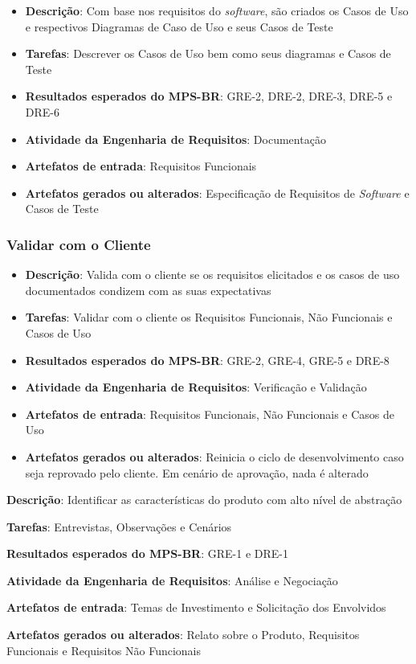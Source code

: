 \begin{itemize}
\item \textbf{Descrição}: Com base nos requisitos do \textit{software}, são criados os Casos de Uso e respectivos Diagramas de Caso de Uso e seus Casos de Teste
\item \textbf{Tarefas}: Descrever os Casos de Uso bem como seus diagramas e Casos de Teste
\item \textbf{Resultados esperados do MPS-BR}: GRE-2, DRE-2, DRE-3, DRE-5 e DRE-6
\item \textbf{Atividade da Engenharia de Requisitos}: Documentação
\item \textbf{Artefatos de entrada}: Requisitos Funcionais
\item \textbf{Artefatos gerados ou alterados}: Especificação de Requisitos de \textit{Software} e Casos de Teste
\end{itemize}

\subsubsection{Validar com o Cliente}

\begin{itemize}
\item \textbf{Descrição}: Valida com o cliente se os requisitos elicitados e os casos de uso documentados condizem com as suas expectativas
\item \textbf{Tarefas}: Validar com o cliente os Requisitos Funcionais, Não Funcionais e Casos de Uso
\item \textbf{Resultados esperados do MPS-BR}: GRE-2, GRE-4, GRE-5 e DRE-8
\item \textbf{Atividade da Engenharia de Requisitos}: Verificação e Validação
\item \textbf{Artefatos de entrada}: Requisitos Funcionais, Não Funcionais e Casos de Uso
\item \textbf{Artefatos gerados ou alterados}: Reinicia o ciclo de desenvolvimento caso seja reprovado pelo cliente. Em cenário de aprovação, nada é alterado
\end{itemize}

\begin{description}
\item\textbf{Descrição}: Identificar as características do produto com alto nível de abstração
\item\textbf{Tarefas}: Entrevistas, Observações e Cenários
\item\textbf{Resultados esperados do MPS-BR}: GRE-1 e DRE-1
\item\textbf{Atividade da Engenharia de Requisitos}: Análise e Negociação
\item\textbf{Artefatos de entrada}: Temas de Investimento e Solicitação dos Envolvidos
\item\textbf{Artefatos gerados ou alterados}: Relato sobre o Produto, Requisitos Funcionais e Requisitos Não Funcionais
\end{description}

